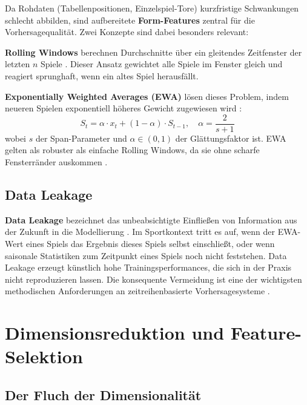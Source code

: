 Da Rohdaten (Tabellenpositionen, Einzelspiel-Tore) kurzfristige
Schwankungen schlecht abbilden, sind aufbereitete \textbf{Form-Features}
zentral für die Vorhersagequalität. Zwei Konzepte sind dabei besonders
relevant:

\textbf{Rolling Windows} berechnen Durchschnitte über ein gleitendes
Zeitfenster der letzten $n$ Spiele \cite{BunkerThabtah2019}. Dieser
Ansatz gewichtet alle Spiele im Fenster gleich und reagiert sprunghaft,
wenn ein altes Spiel herausfällt.

\textbf{Exponentially Weighted Averages (EWA)} lösen dieses Problem,
indem neueren Spielen exponentiell höheres Gewicht zugewiesen wird
\cite{Brown1956,HyndmanAthanasopoulos2021}:
\begin{equation}
    S_t = \alpha \cdot x_t + (1 - \alpha) \cdot S_{t-1},
    \quad \alpha = \frac{2}{s + 1}
\end{equation}
wobei $s$ der Span-Parameter und $\alpha \in (0, 1)$ der Glättungsfaktor
ist. EWA gelten als robuster als einfache Rolling Windows, da sie ohne
scharfe Fensterränder auskommen \cite{HyndmanAthanasopoulos2021}.

\subsection{Data Leakage}

\textbf{Data Leakage} bezeichnet das unbeabsichtigte Einfließen von
Information aus der Zukunft in die Modellierung
\cite{KaufmanRossetPerlich2012}. Im Sportkontext tritt es auf, wenn
der EWA-Wert eines Spiels das Ergebnis dieses Spiels selbst einschließt,
oder wenn saisonale Statistiken zum Zeitpunkt eines Spiels noch nicht
feststehen. Data Leakage erzeugt künstlich hohe Trainingsperformances,
die sich in der Praxis nicht reproduzieren lassen. Die konsequente
Vermeidung ist eine der wichtigsten methodischen Anforderungen an
zeitreihenbasierte Vorhersagesysteme \cite{KaufmanRossetPerlich2012}.

\section{Dimensionsreduktion und Feature-Selektion}
\label{sec:dimensionsreduktion}

\subsection{Der Fluch der Dimensionalität}

